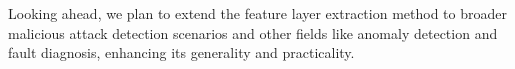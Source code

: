 \documentclass[conference]{IEEEtran}
\begin{document}

Looking ahead, we plan to extend the feature layer extraction method to broader malicious attack detection scenarios and other fields like anomaly detection and fault diagnosis, enhancing its generality and practicality.













\end{document}
